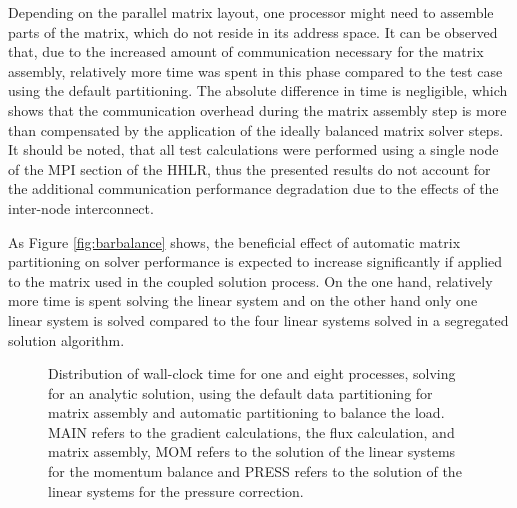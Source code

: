 Depending on the parallel matrix layout, one processor might need to assemble parts of the matrix, which do not reside in its address space. It can be observed that, due to the increased amount of communication necessary for the matrix assembly, relatively more time was spent in this phase compared to the test case using the default partitioning. The absolute difference in time is negligible, which shows that the communication overhead during the matrix assembly step is more than compensated by the application of the ideally balanced matrix solver steps. It should be noted, that all test calculations were performed using a single node of the MPI section of the HHLR, thus the presented results do not account for the additional communication performance degradation due to the effects of the inter-node interconnect.

As Figure \ref{fig:barbalance} shows, the beneficial effect of automatic matrix partitioning on solver performance is expected to increase significantly if applied to the matrix used in the coupled solution process. On the one hand, relatively more time is spent solving the linear system and on the other hand only one linear system is solved compared to the four linear systems solved in a segregated solution algorithm.

\begin{figure}[h!]
\hfil
\caption{Distribution of wall-clock time for one and eight processes, solving for an analytic solution, using the default data partitioning for matrix assembly and automatic partitioning to balance the load. MAIN refers to the gradient calculations, the flux calculation, and matrix assembly, MOM refers to the solution of the linear systems for the momentum balance and PRESS refers to the solution of the linear systems for the pressure correction.}
\label{fig:distseg}
\end{figure}


